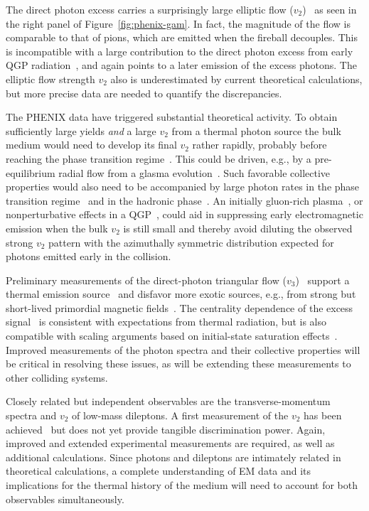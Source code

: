 The direct photon excess carries a surprisingly large elliptic flow
($v_2$)~\cite{Adare:2011zr,Bannier:2014bja} as seen in the right panel of Figure~\ref{fig:phenix-gam}.
In fact, the magnitude of the flow is comparable to that of pions, which are emitted
when the fireball decouples. This is incompatible with
a large contribution to the direct photon excess from early QGP
radiation~\cite{Chatterjee:2005de,Liu:2009kta,Holopainen:2011pd,vanHees:2011vb,Dion:2011pp,Shen:2013cca,Linnyk:2013wma},
and again points to a later emission of the excess photons. The elliptic flow strength $v_2$ also is underestimated
by current theoretical calculations, but more precise data are needed to quantify the discrepancies.

The PHENIX data have triggered substantial theoretical activity. To obtain sufficiently large yields 
{\em and} a large $v_2$ from a thermal photon source the bulk medium would need to develop its final $v_2$ rather 
rapidly, probably before reaching the phase transition regime~\cite{vanHees:2011vb}. This could be driven, 
e.g., by a pre-equilibrium radial flow from a glasma evolution~\cite{Dusling:2010rm,Chen:2013ksa}.
Such favorable collective properties would also need to be accompanied by large photon rates in the phase transition
regime~\cite{vanHees:2011vb,Shen:2013vja,vanHees:2014ida} and in the hadronic
phase~\cite{Turbide:2003si}. An initially gluon-rich plasma~\cite{McLerran:2014hza}, or 
nonperturbative effects in a QGP~\cite{Gale:2014dfa}, could aid in suppressing
early electromagnetic emission when the bulk $v_2$ is still small
and thereby avoid diluting the observed strong $v_2$ pattern with the azimuthally symmetric
distribution expected for photons emitted early in the collision.

Preliminary measurements of the direct-photon triangular flow ($v_3$)~\cite{Bannier:2014bja}
support a thermal emission source~\cite{Shen:2013cca} and disfavor more exotic sources, e.g.,
from strong but short-lived primordial magnetic fields~\cite{Basar:2012bp,Bzdak:2012fr}.
The centrality dependence of the excess signal~\cite{Adare:2014fwh} is consistent
with expectations from thermal radiation, but is also compatible with scaling arguments based on
initial-state saturation effects~\cite{McLerran:2014oea}. Improved measurements of the
photon spectra and their collective properties will be critical in resolving these issues, as will 
be extending these measurements to other colliding systems. 

Closely related but independent observables are the transverse-momentum spectra and $v_2$ of
low-mass dileptons.
A first measurement of
the $v_2$ has been achieved~\cite{Adamczyk:2014lpa} but does not yet provide tangible
discrimination power. 
Again, improved and extended experimental measurements are required, as well
as additional calculations. Since photons and dileptons are intimately related in theoretical
calculations, a complete understanding of EM data and its implications for the thermal 
history of the medium will need to account for both observables
simultaneously.
